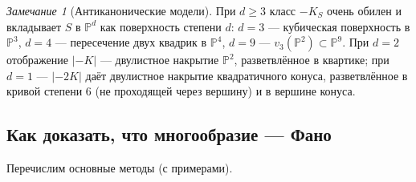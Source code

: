 \documentclass[11pt,a4paper]{article}
\theoremstyle{plain}
\theoremstyle{definition}
\theoremstyle{remark}
\newtheorem{remark}[theorem]{Замечание}
\newcommand{\PP}{\mathbb{P}}
\begin{document}
\begin{remark}[Антиканонические модели]
При $d\ge3$ класс $-K_S$ очень обилен и вкладывает $S$ в $\PP^d$ как поверхность степени $d$: $d=3$ ---
кубическая поверхность в $\PP^3$, $d=4$ --- пересечение двух квадрик в $\PP^4$, $d=9$ --- $v_3(\PP^2)\subset\PP^9$.
При $d=2$ отображение $|-K|$ --- двулистное накрытие $\PP^2$, разветвлённое в квартике; при $d=1$ ---
$|-2K|$ даёт двулистное накрытие квадратичного конуса, разветвлённое в кривой степени 6 (не проходящей через вершину) и в вершине конуса.
\end{remark}

\subsection{Как доказать, что многообразие --- Фано}

Перечислим основные методы (с примерами).
\end{document}
